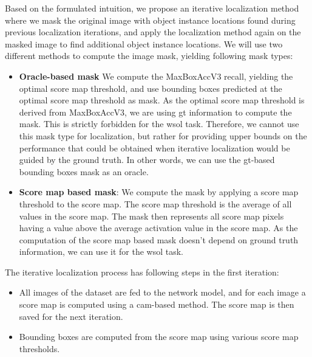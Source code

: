 Based on the formulated intuition, we propose an iterative localization method where we mask the original image with object instance locations found during previous localization iterations, and apply the localization method again on the masked image to find additional object instance locations. We will use two different methods to compute the image mask, yielding following mask types:
\begin{itemize}
\item \textbf{Oracle-based mask} We compute the MaxBoxAccV3 recall, yielding the optimal score map threshold, and use bounding boxes predicted at the optimal score map threshold as mask. As the optimal score map threshold is derived from MaxBoxAccV3, we are using \acrfull{gt} information to compute the mask. This is strictly forbidden for the \acrshort{wsol} task. Therefore, we cannot use this mask type for localization, but rather for providing upper bounds on the performance that could be obtained when iterative localization would be guided by the ground truth. In other words, we can use the \acrshort{gt}-based bounding boxes mask as an oracle.
\item \textbf{Score map based mask}: We compute the mask by applying a score map threshold to the score map. The score map threshold is the average of all values in the score map. The mask then represents all score map pixels having a value above the average activation value in the score map. As the computation of the score map based mask doesn't depend on ground truth information, we can use it for the \acrshort{wsol} task.
\end{itemize}

The iterative localization process has following steps in the first iteration:
\begin{itemize}
    \item All images of the dataset are fed to the network model, and for each image a score map is computed using a \acrshort{cam}-based method. The score map is then saved for the next iteration.
    \item Bounding boxes are computed from the score map using various score map thresholds.
\end{itemize}

